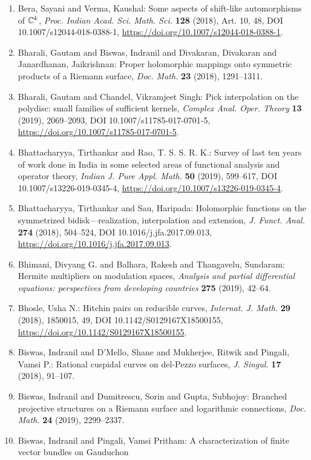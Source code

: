 \begin{enumerate}
\item Bera, Sayani and Verma, Kaushal: Some aspects of shift-like automorphisms of {$\Bbb C^k$}, \emph{Proc. Indian Acad. Sci. Math. Sci.} {\bf 128} (2018), Art. 10, 48, DOI 10.1007/s12044-018-0388-1, \url{https://doi.org/10.1007/s12044-018-0388-1}.
\item Bharali, Gautam and Biswas, Indranil and Divakaran, Divakaran
and Janardhanan, Jaikrishnan: Proper holomorphic mappings onto symmetric products of a
{R}iemann surface, \emph{Doc. Math.} {\bf 23} (2018), 1291--1311.
\item Bharali, Gautam and Chandel, Vikramjeet Singh: Pick interpolation on the polydisc: small families of
sufficient kernels, \emph{Complex Anal. Oper. Theory} {\bf 13} (2019), 2069--2093, DOI 10.1007/s11785-017-0701-5, \url{https://doi.org/10.1007/s11785-017-0701-5}.
\item Bhattacharyya, Tirthankar and Rao, T. S. S. R. K.: Survey of last ten years of work done in {I}ndia in some
selected areas of functional analysis and operator theory, \emph{Indian J. Pure Appl. Math.} {\bf 50} (2019), 599--617, DOI 10.1007/s13226-019-0345-4, \url{https://doi.org/10.1007/s13226-019-0345-4}.
\item Bhattacharyya, Tirthankar and Sau, Haripada: Holomorphic functions on the symmetrized bidisk---realization,
interpolation and extension, \emph{J. Funct. Anal.} {\bf 274} (2018), 504--524, DOI 10.1016/j.jfa.2017.09.013, \url{https://doi.org/10.1016/j.jfa.2017.09.013}.
\item Bhimani, Divyang G. and Balhara, Rakesh and Thangavelu,
Sundaram: Hermite multipliers on modulation spaces, \emph{Analysis and partial differential equations: perspectives from
developing countries} {\bf 275} (2019), 42--64.
\item Bhosle, Usha N.: Hitchin pairs on reducible curves, \emph{Internat. J. Math.} {\bf 29} (2018), 1850015, 49, DOI 10.1142/S0129167X18500155, \url{https://doi.org/10.1142/S0129167X18500155}.
\item Biswas, Indranil and D'Mello, Shane and Mukherjee, Ritwik and
Pingali, Vamsi P.: Rational cuspidal curves on del-{P}ezzo surfaces, \emph{J. Singul.} {\bf 17} (2018), 91--107.
\item Biswas, Indranil and Dumitrescu, Sorin and Gupta, Subhojoy: Branched projective structures on a {R}iemann surface and
logarithmic connections, \emph{Doc. Math.} {\bf 24} (2019), 2299--2337.
\item Biswas, Indranil and Pingali, Vamsi Pritham: A characterization of finite vector bundles on {G}auduchon

\end{enumerate}
